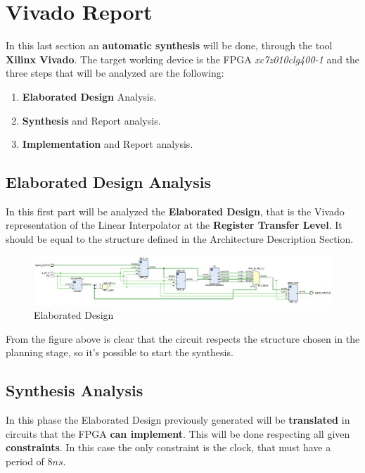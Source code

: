 \section{Vivado Report}

In this last section an \textbf{automatic synthesis} will be done, through the tool \textbf{Xilinx Vivado}. The target working device is the FPGA \textit{xc7z010clg400-1} and the three steps that will be analyzed are the following:

\begin{enumerate}
    \item \textbf{Elaborated Design} Analysis.
    \item \textbf{Synthesis} and Report analysis.
    \item \textbf{Implementation} and Report analysis.
\end{enumerate}

\subsection{Elaborated Design Analysis}

In this first part will be analyzed the \textbf{Elaborated Design}, that is the Vivado representation of the Linear Interpolator at the \textbf{Register Transfer Level}. It should be equal to the structure defined in the  Architecture Description Section.

\begin{figure}[H]
    \centering
    \includegraphics[width=1\textwidth]{img/Chapter5/Elaborated.png}
    \caption{Elaborated Design}
    \label{fig:ED}
\end{figure}

From the figure above is clear that the circuit respects the structure chosen in the planning stage, so it's possible to start the synthesis.

\subsection{Synthesis Analysis}

In this phase the Elaborated Design previously generated will be \textbf{translated} in circuits that the FPGA \textbf{can implement}. This will be done respecting all given \textbf{constraints}. In this case the only constraint is the clock, that must have a period of $8ns$.

